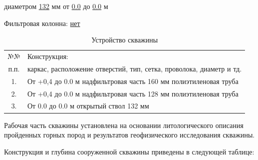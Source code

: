 \documentclass[a4paper,12pt]{article} %
\DeclareRobustCommand{\diameter}{%
	\text{\usefont{LS1}{stixscr}{m}{n}\symbol{"60}}%
}
\newcommand{\txtOgolovok}{+0,4}					%
\newcommand{\txtDepth}{0.0}					%
\newcommand{\txtCondMaterial}{полиэтиленовая}	%
\newcommand{\txtCondDiam}{160}					%
\newcommand{\txtCondBtm}{0.0}					%
\newcommand{\txtTubeMaterial}{полиэтиленовая}	%
\newcommand{\txtTubeDiam}{128}					%
\newcommand{\txtTubeBtm}{0.0}					%
\begin{document}
	 диаметром \underline{132} мм от \underline{\num{\txtTubeBtm}} до \underline{\num{\txtDepth}} м 
    
    \bigskip
	
	Фильтровая колонна: \underline{нет}
	

\begin{table}[!h]
	\caption{Устройство скважины}
	\centering
	\begin{tabularx}{\textwidth}{|c|X|}
		\hline 
		№№ & Конструкция: \\ 
		п.п. & каркас, расположение отверстий, тип, сетка, проволока, диаметр и тд. \\ 
		\hline 
		1. & От {\txtOgolovok} до {\num{\txtCondBtm}} м   надфильтровая часть \diameter {\txtCondDiam} мм {\txtCondMaterial} труба \\ 
		\hline 
		2. & От {\txtOgolovok} до {\num{\txtTubeBtm}} м   надфильтровая часть \diameter {\txtTubeDiam} мм {\txtTubeMaterial} труба \\ 
		\hline 
		3. & От {\num{\txtTubeBtm}} до {\num{\txtDepth}} м   открытый ствол {\diameter} 132 мм \\ 
		\hline 
	\end{tabularx} 
\end{table}


Рабочая часть скважины установлена на основании литологического описания пройденных горных пород и результатов геофизического исследования скважины.

\newpage

Конструкция и глубина сооруженной скважины приведены в следующей таблице:
\end{document}
